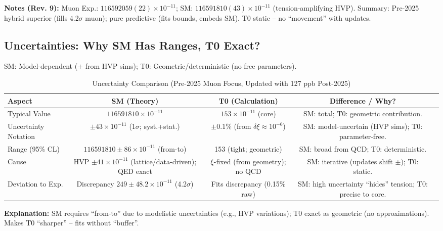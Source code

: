 \documentclass[12pt,a4paper]{article}
\theoremstyle{definition}
\begin{document}
	\textbf{Notes (Rev. 9):} Muon Exp.: $116592059(22) \times 10^{-11}$; SM: $116591810(43) \times 10^{-11}$ (tension-amplifying HVP). Summary: Pre-2025 hybrid superior (fills 4.2$\sigma$ muon); pure predictive (fits bounds, embeds SM). T0 static -- no ``movement'' with updates.
	
	\subsection{Uncertainties: Why SM Has Ranges, T0 Exact?}
	
	SM: Model-dependent ($\pm$ from HVP sims); T0: Geometric/deterministic (no free parameters).
	
	\begin{table}[ht!]
		\centering
		\small
		\begin{adjustbox}{max width=\textwidth}
			\begin{tabular}{@{}lcccr@{}}
				\toprule
				Aspect & SM (Theory) & T0 (Calculation) & Difference / Why? \\
				\midrule
				Typical Value & $116591810 \times 10^{-11}$ & $153 \times 10^{-11}$ (core) & SM: total; T0: geometric contribution. \\
				Uncertainty Notation & $\pm 43 \times 10^{-11}$ (1$\sigma$; syst.+stat.) & $\pm 0.1\%$ (from $\delta\xi \approx 10^{-6}$) & SM: model-uncertain (HVP sims); T0: parameter-free. \\
				Range (95\% CL) & $116591810 \pm 86 \times 10^{-11}$ (from-to) & 153 (tight; geometric) & SM: broad from QCD; T0: deterministic. \\
				Cause & HVP $\pm 41 \times 10^{-11}$ (lattice/data-driven); QED exact & $\xi$-fixed (from geometry); no QCD & SM: iterative (updates shift $\pm$); T0: static. \\
				Deviation to Exp. & Discrepancy $249 \pm 48.2 \times 10^{-11}$ (4.2$\sigma$) & Fits discrepancy (0.15\% raw) & SM: high uncertainty ``hides'' tension; T0: precise to core. \\
				\bottomrule
			\end{tabular}
		\end{adjustbox}
		\caption{Uncertainty Comparison (Pre-2025 Muon Focus, Updated with 127 ppb Post-2025)}
		\label{tab:uncertainties}
	\end{table}
	
	\textbf{Explanation:} SM requires ``from-to'' due to modelistic uncertainties (e.g., HVP variations); T0 exact as geometric (no approximations). Makes T0 ``sharper'' -- fits without ``buffer''.
	
\end{document}
